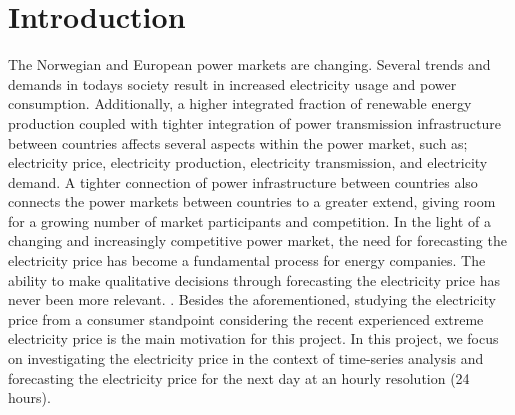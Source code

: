 \documentclass
[twocolumn,
secnumarabic,
nobibnotes,
aps,
prl,
reprint,
groupedaddress,
amsmath,
amssymb,
]{revtex4-2}
\begin{document}
\section{Introduction}
The Norwegian and European power markets are changing. Several trends and demands in todays society result in increased electricity usage and power consumption. Additionally, a higher integrated fraction of renewable energy production coupled with tighter integration of power transmission infrastructure between countries affects several aspects within the power market, such as; electricity price, electricity production, electricity transmission, and electricity demand. A tighter connection of power infrastructure between countries also connects the power markets between countries to a greater extend, giving room for a growing number of market participants and competition. In the light of a changing and increasingly competitive power market, the need for forecasting the electricity price has become a fundamental process for energy companies. The ability to make qualitative decisions through forecasting the electricity price has never been more relevant. \cite{nowotarski_recent_2018}. Besides the aforementioned, studying the electricity price from a consumer standpoint considering the recent 
experienced extreme electricity price is the main motivation for this project. In this project, we focus on investigating the electricity price in the context of time-series analysis and forecasting the electricity price for the next day at an hourly resolution (24 hours). 
\\\\
\end{document}
